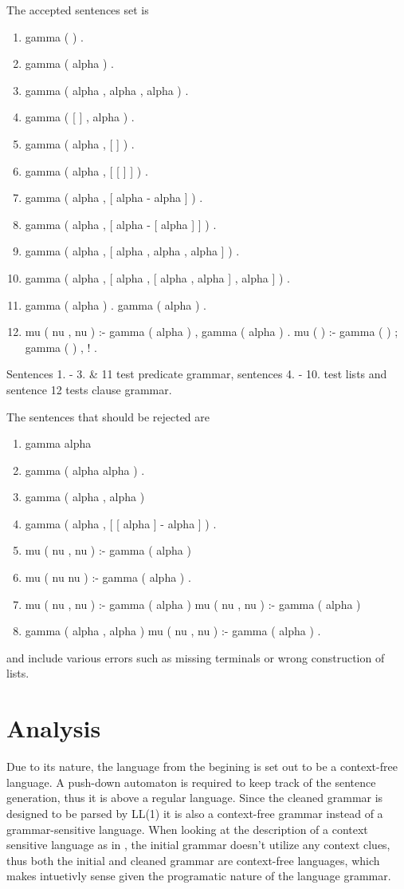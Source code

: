 \documentclass{article}
\begin{document}
The accepted sentences set is 
\begin{enumerate}
    \item gamma ( ) .
    \item gamma ( alpha ) .
    \item gamma ( alpha , alpha , alpha ) .
    \item gamma ( [ ] , alpha ) .
    \item gamma ( alpha , [ ] ) .
    \item gamma ( alpha , [ [ ] ] ) .
    \item gamma ( alpha , [ alpha - alpha ] ) .
    \item gamma ( alpha , [ alpha - [ alpha ] ] ) .
    \item gamma ( alpha , [ alpha , alpha , alpha ] ) .
    \item gamma ( alpha , [ alpha , [ alpha , alpha ] , alpha ] ) .
    \item gamma ( alpha ) . gamma ( alpha ) .
    \item mu ( nu , nu ) :- gamma ( alpha ) , gamma ( alpha ) . mu ( ) :- gamma ( ) ; gamma ( ) , ! .  
\end{enumerate}
Sentences 1. - 3. \& 11 test predicate grammar, sentences 4. - 10. test lists and sentence 12 tests clause grammar.

The sentences that should be rejected are 
\begin{enumerate}
    \item gamma alpha
    \item gamma ( alpha alpha ) .
    \item gamma ( alpha , alpha )
    \item gamma ( alpha , [ [ alpha ] - alpha ] ) .
    \item mu ( nu , nu ) :- gamma ( alpha )
    \item mu ( nu  nu ) :- gamma ( alpha ) .
    \item mu ( nu , nu ) :- gamma ( alpha ) mu ( nu , nu ) :- gamma ( alpha )
    \item gamma ( alpha , alpha ) mu ( nu , nu ) :- gamma ( alpha ) . 
\end{enumerate}
and include various errors such as missing terminals or wrong construction of lists.

\section{Analysis}
Due to its nature, the language from the begining is set out to be a context-free language. A push-down automaton
is required to keep track of the sentence generation, thus it is above a regular language.
Since the cleaned grammar is designed to be parsed by LL(1) it is also a context-free grammar instead of a grammar-sensitive language.
When looking at the description of a context sensitive language as in \cite{g4g-csg}, the initial grammar
doesn't utilize any context clues, thus both the initial and cleaned grammar are context-free languages, which makes intuetivly sense given
the programatic nature of the language grammar.



\end{document}
